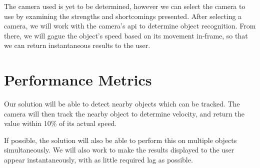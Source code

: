 \documentclass[letterpaper,10pt,onecolumn,draftclsnofoot]{IEEEtran}
\begin{document}
The camera used is yet to be determined, however we can select the camera to use by examining the strengths and shortcomings presented.
After selecting a camera, we will work with the camera's api to determine object recognition.
From there, we will gague the object's speed based on its movement in-frame, so that we can return instantaneous results to the user.

\section{Performance Metrics}

Our solution will be able to detect nearby objects which can be tracked.
The camera will then track the nearby object to determine velocity, and return the value within 10\% of its actual speed.

If possible, the solution will also be able to perform this on multiple objects simultaneously.
We will also work to make the results displayed to the user appear instantaneously, with as little required lag as possible.


\end{document}
